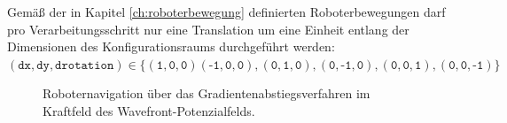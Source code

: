 Gemäß der in Kapitel \ref{ch:roboterbewegung} definierten Roboterbewegungen darf pro Verarbeitungsschritt nur eine Translation um eine Einheit entlang der Dimensionen des Konfigurationsraums  durchgeführt werden: $ (\texttt{dx}, \texttt{dy}, \texttt{drotation}) \in \{(\texttt{1},\texttt{0},\texttt{0})(\texttt{-1},\texttt{0},\texttt{0}),(\texttt{0},\texttt{1},\texttt{0}),(\texttt{0},\texttt{-1},\texttt{0}),(\texttt{0},\texttt{0},\texttt{1}),(\texttt{0},\texttt{0},\texttt{-1})\}$
\vspace*{0.1cm}
\begin{figure}[h!]
	\centering
	\footnotesize
	\centerline{}
	\caption{Roboternavigation über das Gradientenabstiegsverfahren im Kraftfeld des Wavefront-Potenzialfelds.}
\end{figure}




